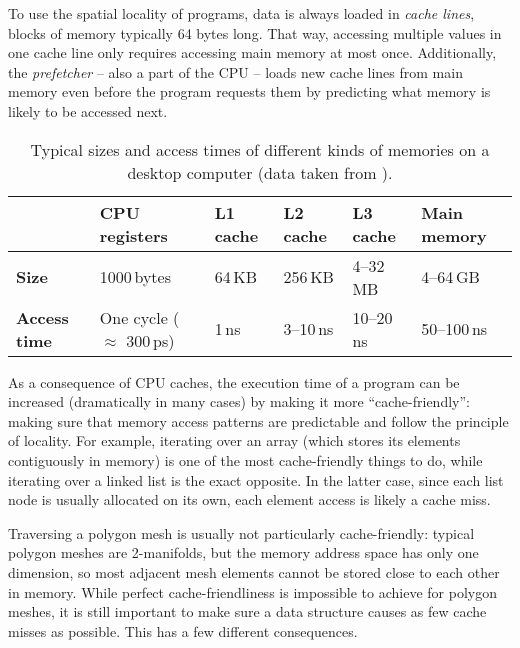 To use the spatial locality of programs, data is always loaded in \emph{cache lines}, blocks of memory typically 64 bytes long.
That way, accessing multiple values in one cache line only requires accessing main memory at most once.
Additionally, the \emph{prefetcher} -- also a part of the CPU -- loads new cache lines from main memory even before the program requests them by predicting what memory is likely to be accessed next.

\begin{table}[t]
  \centering
  \sffamily
  \renewcommand{\arraystretch}{1.1}
  \begin{tabular}{llllll}
  & \textbf{CPU registers} & \textbf{L1 cache} & \textbf{L2 cache} & \textbf{L3 cache} & \textbf{Main memory} \\\hline
  \textbf{Size} & 1000\,bytes & 64\,KB & 256\,KB & 4--32\,MB & 4--64\,GB \\\hdashline[.4mm/1mm]
  \textbf{Access time} & One cycle ($\approx$ 300\,ps) & 1\,ns & 3--10\,ns & 10--20\,ns & 50--100\,ns \\
  \end{tabular}
  \renewcommand{\arraystretch}{1.0}
  \caption{Typical sizes and access times of different kinds of memories on a desktop computer (data taken from \cite{hennessy2017computer}).}
  \label{tbl:caches}
  \vspace{5mm}
\end{table}

As a consequence of CPU caches, the execution time of a program can be increased (dramatically in many cases) by making it more \enquote{cache-friendly}: making sure that memory access patterns are predictable and follow the principle of locality.
For example, iterating over an array (which stores its elements contiguously in memory) is one of the most cache-friendly things to do, while iterating over a linked list is the exact opposite.
In the latter case, since each list node is usually allocated on its own, each element access is likely a cache miss.

Traversing a polygon mesh is usually not particularly cache-friendly:
typical polygon meshes are 2-manifolds, but the memory address space has only one dimension, so most adjacent mesh elements cannot be stored close to each other in memory.
While perfect cache-friendliness is impossible to achieve for polygon meshes, it is still important to make sure a data structure causes as few cache misses as possible.
This has a few different consequences.

